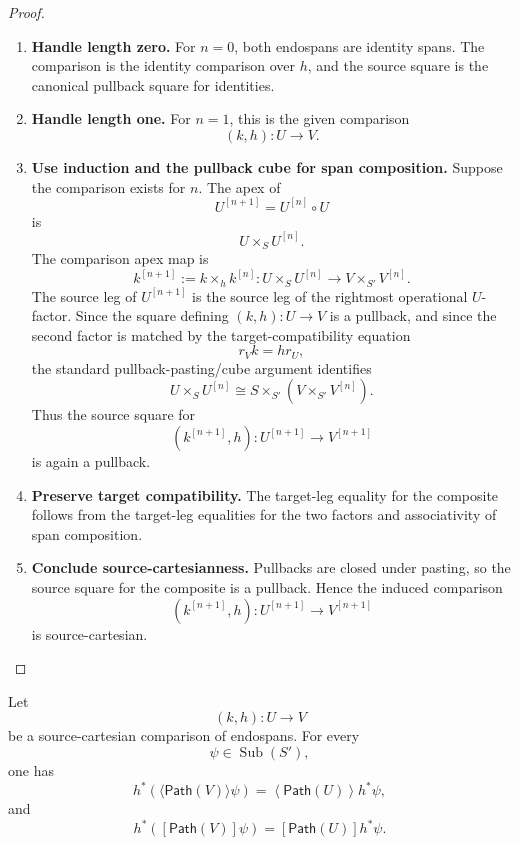 \begin{proof}
\begin{enumerate}
  \item \textbf{Handle length zero.}
  For \(n=0\), both endospans are identity spans. The comparison is the
  identity comparison over \(h\), and the source square is the canonical
  pullback square for identities.

  \item \textbf{Handle length one.}
  For \(n=1\), this is the given comparison
  \[
    (k,h):U\to V.
  \]

  \item \textbf{Use induction and the pullback cube for span composition.}
  Suppose the comparison exists for \(n\). The apex of
  \[
    U^{[n+1]}=U^{[n]}\circ U
  \]
  is
  \[
    U\times_S U^{[n]}.
  \]
  The comparison apex map is
  \[
    k^{[n+1]}:=k\times_h k^{[n]}:
    U\times_S U^{[n]}
    \longrightarrow
    V\times_{S'}V^{[n]}.
  \]
  The source leg of \(U^{[n+1]}\) is the source leg of the rightmost
  operational \(U\)-factor. Since the square defining \((k,h):U\to V\) is a
  pullback, and since the second factor is matched by the target-compatibility
  equation
  \[
    r_Vk=hr_U,
  \]
  the standard pullback-pasting/cube argument identifies
  \[
    U\times_S U^{[n]}
    \cong
    S\times_{S'}(V\times_{S'}V^{[n]}).
  \]
  Thus the source square for
  \[
    (k^{[n+1]},h):U^{[n+1]}\to V^{[n+1]}
  \]
  is again a pullback.

  \item \textbf{Preserve target compatibility.}
  The target-leg equality for the composite follows from the target-leg
  equalities for the two factors and associativity of span composition.

  \item \textbf{Conclude source-cartesianness.}
  Pullbacks are closed under pasting, so the source square for the composite
  is a pullback. Hence the induced comparison
  \[
    (k^{[n+1]},h):U^{[n+1]}\to V^{[n+1]}
  \]
  is source-cartesian.
\end{enumerate}
\end{proof}

\begin{theorem}
\label{thm:stability-finite-paths-feedback}
Let
\[
  (k,h):U\to V
\]
be a source-cartesian comparison of endospans. For every
\[
  \psi\in\operatorname{Sub}(S'),
\]
one has
\[
  h^\ast
  \left(
    \langle\mathsf{Path}(V)\rangle\psi
  \right)
  =
  \left\langle
    \mathsf{Path}(U)
  \right\rangle
  h^\ast\psi,
\]
and
\[
  h^\ast
  \left(
    [\mathsf{Path}(V)]\psi
  \right)
  =
  \left[
    \mathsf{Path}(U)
  \right]
  h^\ast\psi.
\]
\end{theorem}

